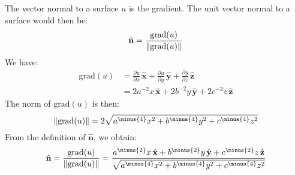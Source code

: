             \begin{solution}
                The vector normal to a surface $u$
                is the gradient. The unit vector normal to a
                surface would then be:
                \begin{equation}
                    \hat{\mathbf{n}}
                    =\frac{\mathrm{grad}(u)}{\lVert\mathrm{grad}(u)\rVert}
                \end{equation}
                We have:
                \begin{subequations}
                    \begin{align}
                        \mathrm{grad}(u)
                        &=\frac{\partial{u}}{\partial{x}}
                            \,\hat{\mathbf{x}}
                            +\frac{\partial{u}}{\partial{y}}
                            \,\hat{\mathbf{y}}
                            +\frac{\partial{y}}{\partial{z}}
                            \,\hat{\mathbf{z}}\\
                        &=2a^{\minus{2}}x\,\hat{\mathbf{x}}
                         +2b^{\minus{2}}y\,\hat{\mathbf{y}}
                         +2c^{\minus{2}}z\,\hat{\mathbf{z}}
                    \end{align}
                \end{subequations}
                The norm of $\mathrm{grad}(u)$ is then:
                \begin{equation}
                    \norm{\mathrm{grad}(u)}
                    =2\sqrt{a^{\minus{4}}x^{2}
                           +b^{\minus{4}}y^{2}
                           +c^{\minus{4}}z^{2}}
                \end{equation}
                From the definition of $\hat{\mathbf{n}}$,
                we obtain:
                \begin{equation}
                    \hat{\mathbf{n}}
                    =\frac{\mathrm{grad}(u)}{\norm{\mathrm{grad}(u)}}
                    =\frac{a^{\minus{2}}x\,\hat{\mathbf{x}}
                          +b^{\minus{2}}y\,\hat{\mathbf{y}}
                          +c^{\minus{2}}z\,\hat{\mathbf{z}}}
                        {\sqrt{a^{\minus{4}}x^{2}
                              +b^{\minus{4}}y^{2}
                              +c^{\minus{4}}z^{2}}}
                \end{equation}
            \end{solution}
            \clearpage
